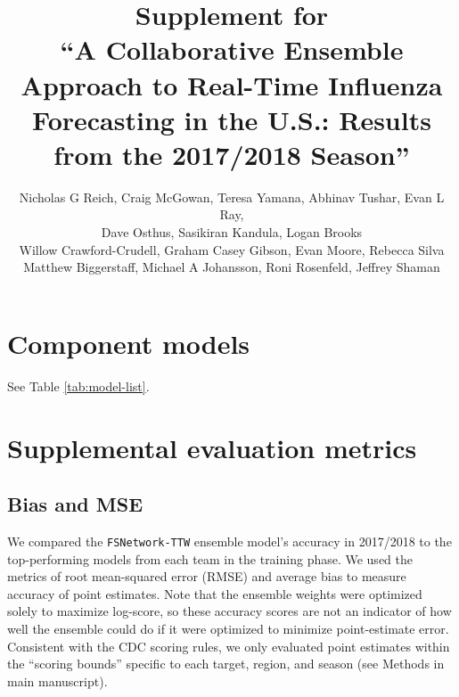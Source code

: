 \documentclass{article}\usepackage[]{graphicx}\usepackage[]{color}
\title{Supplement for\\``A Collaborative Ensemble Approach to Real-Time Influenza Forecasting in the U.S.: Results from the 2017/2018 Season''}
\author{Nicholas G Reich, Craig McGowan, Teresa Yamana, Abhinav Tushar, Evan L Ray,\\
Dave Osthus, Sasikiran Kandula, Logan Brooks\\
Willow Crawford-Crudell, Graham Casey Gibson, Evan Moore, Rebecca Silva\\Matthew Biggerstaff, Michael A Johansson, Roni Rosenfeld, Jeffrey Shaman}
\begin{document}
\maketitle




\section{Component models}
See Table \ref{tab:model-list}.



% 

\section{Supplemental evaluation metrics}

\subsection{Bias and MSE}

We compared the {\tt FSNetwork-TTW} ensemble model's accuracy in 2017/2018 to the top-performing models from each team in the training phase. 
We used the metrics of root mean-squared error (RMSE) and average bias to measure accuracy of point estimates.
Note that the ensemble weights were optimized solely to maximize log-score, so these accuracy scores are not an indicator of how well the ensemble could do if it were optimized to minimize point-estimate error.
Consistent with the CDC scoring rules, we only evaluated point estimates within the ``scoring bounds'' specific to each target, region, and season (see Methods in main manuscript).
\end{document}
